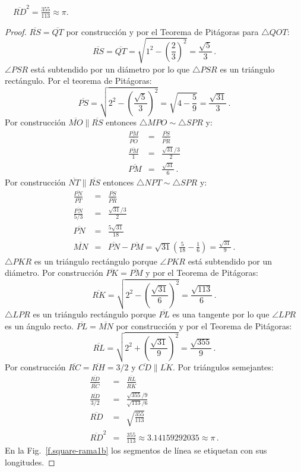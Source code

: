 \begin{theorem}
$\quad\overline{RD}^2=\displaystyle\frac{355}{113}\approx \pi$.
\end{theorem}


\begin{proof}
$\overline{RS}=\overline{QT}$ por construcción y por el Teorema de Pitágoras para $\triangle QOT$:
\[
\overline{RS} =\overline{QT} =\sqrt{1^2-\left(\frac{2}{3}\right)^2}=\frac{\sqrt{5}}{3}\,.
\]
$\angle PSR$ está subtendido por un diámetro por lo que $\triangle PSR$ es un triángulo rectángulo. Por el teorema de Pitágoras:
\[
\overline{PS} = \sqrt{2^2-\left(\frac{\sqrt{5}}{3}\right)^2}=\sqrt{4-\frac{5}{9}}=\frac{\sqrt{31}}{3}\,.
\]
Por construcción $\overline{MO}\parallel \overline{RS}$ entonces
$\triangle MPO\sim \triangle SPR$ y:
%
\begin{eqnarray*}
\frac{\overline{PM}}{\overline{PO}}&=&\frac{\overline{PS}}{\overline{PR}}\\
\frac{\overline{PM}}{1}&=&\frac{\sqrt{31}/3}{2}\\
\overline{PM}&=&\frac{\sqrt{31}}{6}\,.
\end{eqnarray*}
Por construcción $\overline{NT}\parallel \overline{RS}$ entonces 
$\triangle NPT\sim \triangle SPR$ y:
\begin{eqnarray*}
\frac{\overline{PN}}{\overline{PT}}&=&\frac{\overline{PS}}{\overline{PR}}\\
\frac{\overline{PN}}{5/3}&=&\frac{\sqrt{31}/3}{2}\\
\overline{PN}&=&\frac{5\sqrt{31}}{18}\\
\overline{MN}&=&\overline{PN}-\overline{PM}=\sqrt{31}\left(\frac{5}{18}-\frac{1}{6}\right) = \frac{\sqrt{31}}{9}\,.
\end{eqnarray*}
$\triangle PKR$ es un triángulo rectángulo porque $\angle PKR$ está subtendido por un diámetro. Por construcción $\overline{PK}=\overline{PM}$ y por el Teorema de Pitágoras:
\[
\overline{RK}=\sqrt{2^2-\left(\frac{\sqrt{31}}{6}\right)^2} = \frac{\sqrt{113}}{6}\,.
\]
$\triangle LPR$ es un triángulo rectángulo porque $\overline{PL}$ es una tangente por lo que $\angle LPR$ es un ángulo recto. $\overline{PL}=\overline{MN}$ por construcción y por el Teorema de Pitágoras:
\[
\overline{RL}=\sqrt{2^2+\left(\frac{\sqrt{31}}{9}\right)^2} = \frac{\sqrt{355}}{9}\,.
\]
Por construcción
$\overline{RC}=\overline{RH}=3/2$ y $\overline{CD} \parallel \overline{LK}$. Por triángulos semejantes:%
\begin{eqnarray*}
\frac{\overline{RD}}{\overline{RC}}&=&\frac{\overline{RL}}{\overline{RK}}\\
\frac{\overline{RD}}{3/2}&=&\frac{\sqrt{355}/9}{\sqrt{113}/6}\\
\overline{RD}&=&\sqrt{\frac{355}{113}}\\
\overline{RD}^2&=&\frac{355}{113}\approx 3.14159292035\approx \pi\,.
\end{eqnarray*}
En la Fig.~\ref{f.square-rama1b} los segmentos de línea se etiquetan con sus longitudes.
\end{proof}

